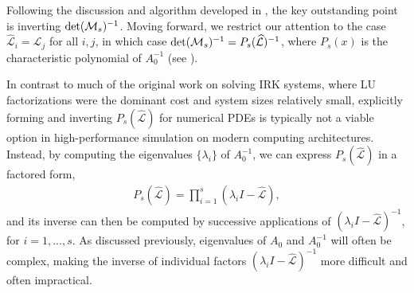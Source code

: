 \documentclass[review]{siamart}
\begin{document}
Following the discussion and algorithm developed in , the key
outstanding point is inverting $\textnormal{det}(\mathcal{M}_s)^{-1}$. Moving forward, we
restrict our attention to the case $\widehat{\mathcal{L}}_i = \widehat{\mathcal{L}}_j$ for all $i,j$,
in which case $\textnormal{det}(\mathcal{M}_s)^{-1} = P_s(\widehat{\mathcal{L}})^{-1}$, where
$P_s(x)$ is the characteristic polynomial of $A_0^{-1}$ (see ).

In contrast to much of the original work on solving IRK systems, where LU factorizations
were the dominant cost and system sizes relatively small, explicitly forming and inverting
$P_s(\widehat{\mathcal{L}})$ for numerical PDEs is typically not a viable option in high-performance
simulation on modern computing architectures. Instead, by computing the eigenvalues
$\{\lambda_i\}$ of $A_0^{-1}$, we can express $P_s(\widehat{\mathcal{L}})$ in a factored form, 
%
\begin{align}\label{eq:fac}
P_s(\widehat{\mathcal{L}}) = \prod_{i=1}^s (\lambda_i I - \widehat{\mathcal{L}}),
\end{align}
%
and its inverse can then be computed by successive applications of $(\lambda_iI - \widehat{\mathcal{L}})^{-1}$,
for $i=1,...,s$. As discussed previously, eigenvalues of $A_0$ and $A_0^{-1}$ will often be
complex, making the inverse of individual factors $(\lambda_iI - \widehat{\mathcal{L}})^{-1}$ more
difficult and often impractical. 
\end{document}
